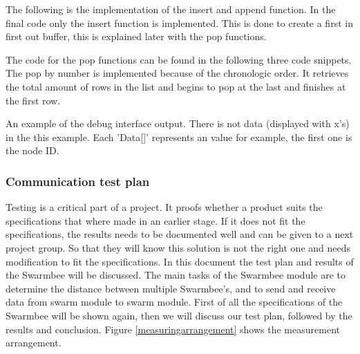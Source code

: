 \documentclass[10pt,a4paper]{article}
\begin{document}
The following is the implementation of the insert and append function. In the final code only the insert function is implemented. This is done to create a first in first out buffer, this is explained later with the pop functions.





The code for the pop functions can be found in the following three code snippets. The pop by number is implemented because of the chronologic order. It retrieves the total amount of rows in the list and begins to pop at the last and finishes at the first row.








An example of the debug interface output. There is not data (displayed with x's) in the this example. Each 'Data[]' represents an value for example, the first one is the node ID.


\subsubsection{Communication test plan}
Testing is a critical part of a project. It proofs whether a product suits the specifications that where made in an earlier stage. If it does not fit the specifications, the results needs to be documented well and can be given to a next project group. So that they will know this solution is not the right one and needs modification to fit the specifications. In this document the test plan and results of the Swarmbee will be discussed. The main tasks of the Swarmbee module are to determine the distance between multiple Swarmbee's, and to send and receive data from swarm module to swarm module. First of all the specifications of the Swarmbee will be shown again, then we will discuss our test plan, followed by the results and conclusion. 
Figure \ref{measuringarrangement} shows the measurement arrangement.
\end{document}
